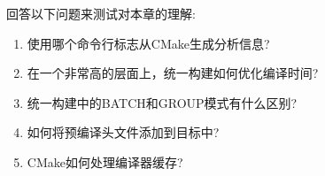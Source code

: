 回答以下问题来测试对本章的理解:

\begin{enumerate}
\item 
使用哪个命令行标志从CMake生成分析信息?

\item 
在一个非常高的层面上，统一构建如何优化编译时间?

\item 
统一构建中的BATCH和GROUP模式有什么区别?

\item 
如何将预编译头文件添加到目标中?

\item 
CMake如何处理编译器缓存?
\end{enumerate}